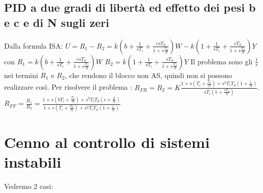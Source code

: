     \subsection{PID a due gradi di libertà ed effetto dei pesi b e c e di N sugli zeri}
    Dalla formula ISA:\newline
    $U = R_1 - R_2 =  k \left( b + \frac{1}{sT_i} + \frac{c s T_d}{1 + s \frac{T_d}{N}} \right) W - k\left( 1 + \frac{1}{sT_i} + \frac{sT_d}{1 + s \frac{T_d}{N}} \right)Y$ \newline
    con \newline
    $R_1 = k \left( b + \frac{1}{sT_i} + \frac{c s T_d}{1 + s \frac{T_d}{N}} \right) W$\newline
    $R_2 = k\left( 1 + \frac{1}{sT_i} + \frac{sT_d}{1 + s \frac{T_d}{N}} \right)Y$\newline
    \newline
    Il problema sono gli $\frac{1}{s}$ nei termini $R_1$ e $R_2$, che rendono il blocco non AS, quindi non si possono realizzare così.\newline
    \newline
    Per risolvere il problema :\newline
    $R_{FB} = R_2 =  K \frac{1 + s\left(T_i + \frac{T_d}{N}\right) + s^2 T_i T_d \left(1 + \frac{1}{N}\right)}{sT_i \left( 1 + \frac{sT_d}{N}\right)}$.\newline
    $R_{FF} = \frac{R_1}{R_2} =  \frac{1+ s\left(bT_i + \frac{T_d}{N}\right) + s^2 T_i T_d \left(c + \frac{b}{N}\right)}{1 + s \left( T_i + \frac{T_d}{N} \right) + s^2 T_i T_d \left( 1 + \frac{1}{N} \right)}$
    \newpage\section{Cenno al controllo di sistemi instabili}
    Vedremo 2 casi:
